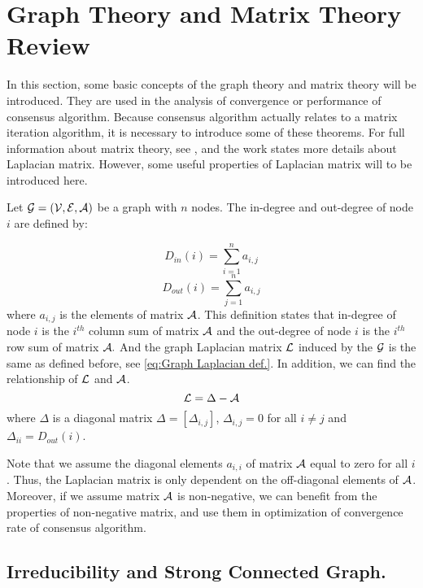 
\section{Graph Theory and Matrix Theory Review }

In this section, some basic concepts of the graph theory and matrix
theory will be introduced. They are used in the analysis of convergence
or performance of consensus algorithm. Because consensus algorithm
actually relates to a matrix iteration algorithm, it is necessary
to introduce some of these theorems. For full information about matrix
theory, see \cite{Varga2010}, and the work \cite{Russell1994} states
more details about Laplacian matrix. However, some useful properties
of Laplacian matrix will to be introduced here. 

Let ${\cal G}=\left({\cal V},{\cal E},{\cal A}\right)$ be a graph
with $n$ nodes. The in-degree and out-degree of node $i$ are defined
by:

\begin{equation}
D_{in}\left(i\right)=\sum_{i=1}^{n}a_{i,j}
\end{equation}
\begin{equation}
D_{out}\left(i\right)=\sum_{j=1}^{n}a_{i,j}
\end{equation}
where $a_{i,j}$ is the elements of matrix ${\cal A}$. This definition
states that in-degree of node $i$ is the $i^{th}$ column sum of
matrix ${\cal A}$ and the out-degree of node $i$ is the $i^{th}$
row sum of matrix ${\cal A}.$ And the graph Laplacian matrix ${\cal L}$
induced by the ${\cal G}$ is the same as defined before, see \ref{eq:Graph Laplacian def.}.
In addition, we can find the relationship of ${\cal L}$ and ${\cal A}$.
\begin{equation}
{\cal L}=\Delta-{\cal A}
\end{equation}
 where $\Delta$ is a diagonal matrix $\Delta=\left[\Delta_{i,j}\right]$,
$\Delta_{i,j}=0$ for all $i\neq j$ and $\Delta_{ii}=D_{out}\left(i\right)$.

Note that we assume the diagonal elements $a_{i,i}$ of matrix ${\cal A}$
equal to zero for all $i$. Thus, the Laplacian matrix is only dependent
on the off-diagonal elements of ${\cal A}$. Moreover, if we assume
matrix ${\cal A}$ is non-negative, we can benefit from the properties
of non-negative matrix, and use them in optimization of convergence
rate of consensus algorithm.


\subsection{Irreducibility and Strong Connected Graph.}

